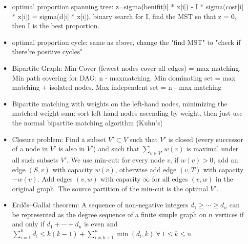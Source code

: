 \begin{itemize}
\item optimal proportion spanning tree: z=sigma(benifit[i] * x[i]) - I * sigma(cost[i] * x[i]) = sigma(d[i] * x[i]). binary search for I, find the MST so that z = 0, then I is the best proportion.
\item optimal proportion cycle: same as above, change the "find MST" to "check if there're positive cycles"
\item Bipartite Graph: Min Cover (fewest nodes cover all edges) = max matching. Min path covering for DAG: n - maxmatching. Min dominating set = max matching + isolated nodes. Max independent set = n - max matching
\item Bipartite matching with weights on the left-hand nodes, minimizing the matched weight sum:
      sort left-hand nodes ascending by weight, then just use the normal bipartite matching algorithm (Kuhn's)
\item Closure problem: Find a subset $V' \subset V$ such that $V'$ is closed (every successor of a node in $V'$ is also in $V'$) and such that $\sum_{v \in V'} w(v)$ is maximal under all such subsets $V'$. We use min-cut: for every node $v$, if $w(v) > 0$, add an edge $(S, v)$ with capacity $w(v)$, otherwise add edge $(v,T)$ with capacity $-w(v)$. Add edges $(v,w)$ with capacity $\infty$ for all edges $(v,w)$ in the original graph. The source partition of the min-cut is the optimal $V'$.
\item Erdős–Gallai theorem: A sequence of non-negative integers $d_1\geq\cdots\geq d_n$ can be represented as the degree sequence of a finite simple graph on $n$ vertices if and only if $d_1+\cdots+d_n$ is even and $\sum^{k}_{i=1}d_i\leq k(k-1)+ \sum^n_{i=k+1} \min(d_i,k) \ \forall\ 1 \leq k \leq n$
\end{itemize}
